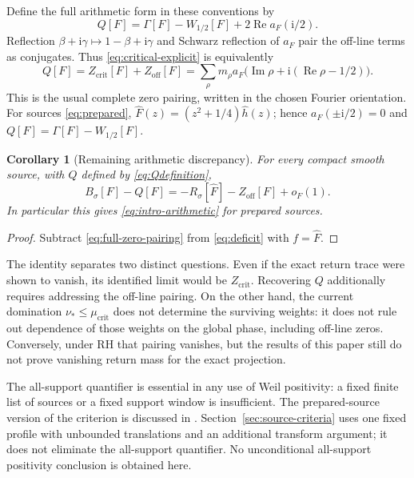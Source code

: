 \documentclass[11pt]{article}
\numberwithin{equation}{section}
\newtheorem{corollary}[theorem]{Corollary}
\theoremstyle{definition}
\theoremstyle{remark}
\newcommand{\Rea}{\operatorname{Re}}
\newcommand{\Ima}{\operatorname{Im}}
\newcommand{\ii}{\mathrm i}
\newcommand{\mucrit}{\mu_{\mathrm{crit}}}
\newcommand{\Zcrit}{Z_{\mathrm{crit}}}
\newcommand{\Zoff}{Z_{\mathrm{off}}}
\begin{document}
Define the full arithmetic form in these conventions by
\begin{equation}\label{eq:Qdefinition}
Q[F]=\Gamma[F]-W_{1/2}[F]+2\Rea a_F(\ii/2).
\end{equation}
Reflection \(\beta+\ii\gamma\mapsto1-\beta+\ii\gamma\)
and Schwarz reflection of \(a_F\) pair the off-line terms as
conjugates. Thus \eqref{eq:critical-explicit} is equivalently
\begin{equation}\label{eq:full-zero-pairing}
Q[F]=\Zcrit[F]+\Zoff[F]
=\sum_\rho m_\rho
a_F\bigl(\Ima\rho+\ii(\Rea\rho-1/2)\bigr).
\end{equation}
This is the usual complete zero pairing, written in the chosen
Fourier orientation. For sources \eqref{eq:prepared},
\(\widehat F(z)=(z^2+1/4)\widehat h(z)\); hence
\(a_F(\pm\ii/2)=0\) and \(Q[F]=\Gamma[F]-W_{1/2}[F]\).

\begin{corollary}[Remaining arithmetic discrepancy]\label{cor:arithmetic}
For every compact smooth source, with \(Q\) defined by
\eqref{eq:Qdefinition},
\[
B_\sigma[F]-Q[F]
=-R_\sigma[\widehat F]-\Zoff[F]+o_F(1).
\]
In particular this gives \eqref{eq:intro-arithmetic} for prepared
sources.
\end{corollary}
\begin{proof}
Subtract \eqref{eq:full-zero-pairing} from \eqref{eq:deficit}
with \(f=\widehat F\).
\end{proof}

The identity separates two distinct questions. Even if the exact
return trace were shown to vanish, its identified limit would be
\(\Zcrit\). Recovering \(Q\) additionally requires addressing
the off-line pairing. On the other hand, the current domination
\(\nu_*\le\mucrit\) does not determine the surviving weights:
it does not rule out dependence of those weights on the global phase,
including off-line zeros. Conversely, under RH that pairing vanishes,
but the results of this paper still do not prove vanishing return
mass for the exact projection.

The all-support quantifier is essential in any use of Weil
positivity: a fixed finite list of sources or a fixed support window is
insufficient. The prepared-source version of the criterion is discussed
in \cite[Appendix C]{CCWeil}. Section~\ref{sec:source-criteria} uses one
fixed profile with unbounded translations and an additional transform
argument; it does not eliminate the all-support quantifier. No
unconditional all-support positivity conclusion is obtained here.
\end{document}
